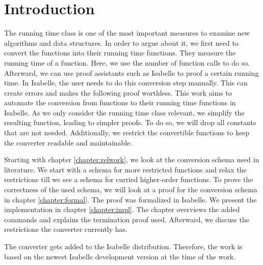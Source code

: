 \chapter{Introduction}\label{chapter:introduction}

The running time class is one of the most important measures to examine new algorithms and data structures.
In order to argue about it, we first need to convert the functions into their running time functions.
They measure the running time of a function.
Here, we use the number of function calls to do so.
Afterward, we can use proof assistants such as Isabelle to proof a certain running time.
In Isabelle, the user needs to do this conversion step manually.
This can create errors and makes the following proof worthless.
This work aims to automate the conversion from functions to their running time functions in Isabelle.
As we only consider the running time class relevant, we simplify the resulting function, leading to simpler proofs.
To do so, we will drop all constants that are not needed.
Additionally, we restrict the convertible functions to keep the converter readable and maintainable.

Starting with chapter \ref{chapter:relwork}, we look at the conversion schema used in literature.
We start with a schema for more restricted functions and relax the restrictions till we see a schema for curried higher-order functions.
To prove the correctness of the used schema, we will look at a proof for the conversion schema in chapter \ref{chapter:formal}.
The proof was formalized in Isabelle.
We present the implementation in chapter \ref{chapter:impl}.
The chapter overviews the added commands and explains the termination proof used.
Afterward, we discuss the restrictions the converter currently has.

The converter gets added to the Isabelle distribution.
Therefore, the work is based on the newest Isabelle development version at the time of the work.
